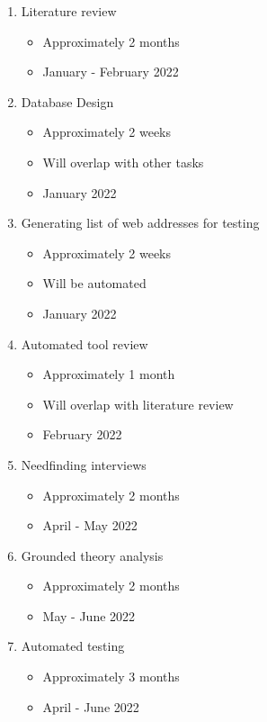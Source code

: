 \documentclass{article}
\begin{document}
\begin{enumerate}
    \item Literature review
    \begin{itemize}
        \item Approximately 2 months
        \item January - February 2022
    \end{itemize}
    \item Database Design
    \begin{itemize}
        \item Approximately 2 weeks
        \item Will overlap with other tasks
        \item January 2022
    \end{itemize}
        \item Generating list of web addresses for testing
    \begin{itemize}
        \item Approximately 2 weeks
        \item Will be automated
        \item January 2022
    \end{itemize}
    \item Automated tool review
    \begin{itemize}
        \item Approximately 1 month
        \item Will overlap with literature review
        \item February 2022
    \end{itemize}
    \item Needfinding interviews
    \begin{itemize}
        \item Approximately 2 months
        \item April - May 2022
    \end{itemize}
    \item Grounded theory analysis
    \begin{itemize}
        \item Approximately 2 months
        \item May - June 2022
    \end{itemize}
    \item Automated testing
    \begin{itemize}
        \item Approximately 3 months
        \item April - June 2022

\end{itemize}
\end{enumerate}
\end{document}

